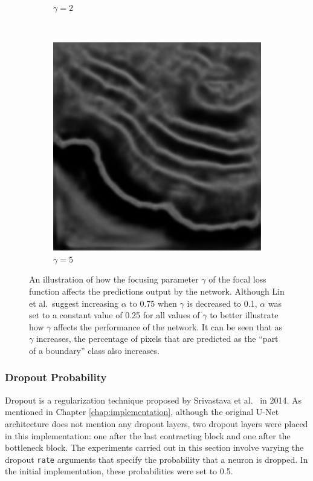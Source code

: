 \begin{figure}[t]
\begin{subfigure}[t]{0.32\textwidth}
        \caption{$\gamma=2$}
    \end{subfigure}
    ~
    \begin{subfigure}[t]{0.32\textwidth}
        \centering
        \includegraphics[width=1\textwidth, valign=c]{images/focal_g5.png}
        \caption{$\gamma=5$}
    \end{subfigure}
    \caption{An illustration of how the focusing parameter $\gamma$ of the focal loss function affects the predictions output by the network. Although Lin et al.\ suggest increasing $\alpha$ to 0.75 when $\gamma$ is decreased to 0.1, $\alpha$ was set to a constant value of 0.25 for all values of $\gamma$ to better illustrate how $\gamma$ affects the performance of the network. It can be seen that as $\gamma$ increases, the percentage of pixels that are predicted as the ``part of a boundary'' class also increases.}
    \label{fig:lossfunctiondiff}
\end{figure}

\subsubsection{Dropout Probability}

Dropout is a regularization technique proposed by Srivastava et al.~\cite{dropout} in 2014. As mentioned in Chapter \ref{chap:implementation}, although the original U-Net architecture does not mention any dropout layers, two dropout layers were placed in this implementation: one after the last contracting block and one after the bottleneck block. The experiments carried out in this section involve varying the dropout \texttt{rate} arguments that specify the probability that a neuron is dropped. In the initial implementation, these probabilities were set to 0.5.

